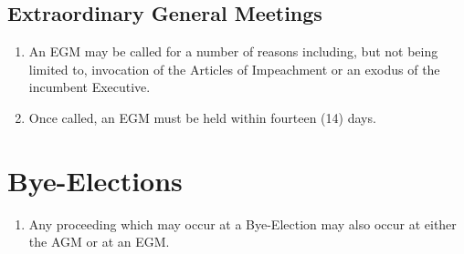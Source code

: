 \documentclass{scrartcl}
\begin{document}
        \subsection{Extraordinary General Meetings}
            \label{gm--egm}
            \begin{enumerate}
                \item An EGM may be called for a number of reasons including, but not being limited to, invocation of the Articles of Impeachment or an exodus of the incumbent Executive.
                \item Once called, an EGM must be held within fourteen (14) days.
            \end{enumerate}

    \clearpage
    \section{Bye-Elections}
        \label{bye-election}
        \begin{enumerate}
            \item Any proceeding which may occur at a Bye-Election may also occur at either the AGM or at an EGM.
        \end{enumerate}
\end{document}
